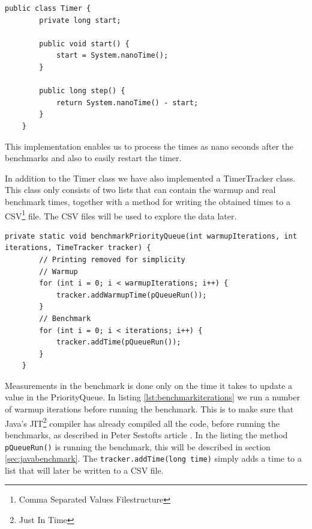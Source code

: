 \documentclass{article}
\begin{document}
\begin{lstlisting}[caption={Simple Timer class implementation},label={lst:timerclass}]
    public class Timer {
        private long start;

        public void start() {
            start = System.nanoTime();
        }

        public long step() {
            return System.nanoTime() - start;
        }
    }
\end{lstlisting}

This implementation enables us to process the times as nano seconds after 
the benchmarks and also to easily restart the timer.

In addition to the Timer class we have also implemented a TimerTracker class.
This class only consists of two lists that can contain the warmup and real 
benchmark times, together with a method for writing the obtained times to a CSV\footnote{Comma Separated Values Filestructure} file.
The CSV files will be used to explore the data later.

\begin{lstlisting}[caption={Benchmark iterations}, label={lst:benchmarkiterations}]
    private static void benchmarkPriorityQueue(int warmupIterations, int iterations, TimeTracker tracker) {
        // Printing removed for simplicity
        // Warmup
        for (int i = 0; i < warmupIterations; i++) {
            tracker.addWarmupTime(pQueueRun());
        }
        // Benchmark
        for (int i = 0; i < iterations; i++) {
            tracker.addTime(pQueueRun());
        }
    }
\end{lstlisting}

Measurements in the benchmark is done only on the time it takes to update 
a value in the PriorityQueue. In listing \ref{lst:benchmarkiterations} we run a number of warmup iterations before running the
benchmark. This is to make sure that Java's JIT\footnote{Just In Time} 
compiler has already compiled all the code, before running the benchmarks, as described in Peter Sestofts article \cite{microbenchmarks9-10}. 
In the listing the method \lstinline{pQueueRun()} is running the benchmark, this will be described 
in section \ref{sec:javabenchmark}. The \lstinline{tracker.addTime(long time)} 
simply adds a time to a list that will later be written to a CSV file.

\end{document}
